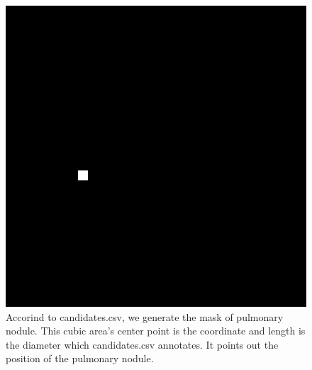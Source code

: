 \documentclass[conference]{IEEEtran}
\begin{document}
\begin{figure}[htbp]
    \centerline{\includegraphics[scale=0.5]{1.jpg}}
    \caption{Accorind to candidates.csv, we generate the mask of pulmonary nodule. This cubic area's center point is the coordinate and length is the diameter which candidates.csv annotates. It points out the position of the pulmonary nodule.}
    \label{fig1}
    \end{figure}
\end{document}
